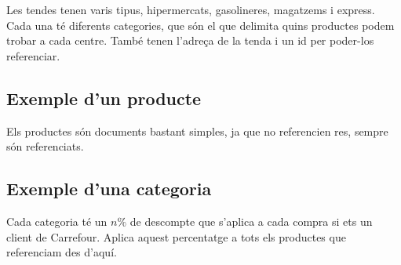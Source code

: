 Les tendes tenen varis tipus, hipermercats, gasolineres, magatzems i express. Cada una té diferents categories, que són el que delimita quins productes podem trobar a cada centre.
També tenen l'adreça de la tenda i un id per poder-los referenciar.

\subsection{Exemple d'un producte}

\begin{singlespace}
  \begin{verbnobox}
  \end{verbnobox}
\end{singlespace}

Els productes són documents bastant simples, ja que no referencien res, sempre són referenciats.

\newpage

\subsection{Exemple d'una categoria}

\begin{singlespace}
  \begin{verbnobox}
  \end{verbnobox}
\end{singlespace}

Cada categoria té un $n\%$ de descompte que s'aplica a cada compra si ets un client de Carrefour. Aplica aquest percentatge a tots els productes que referenciam des d'aquí.
